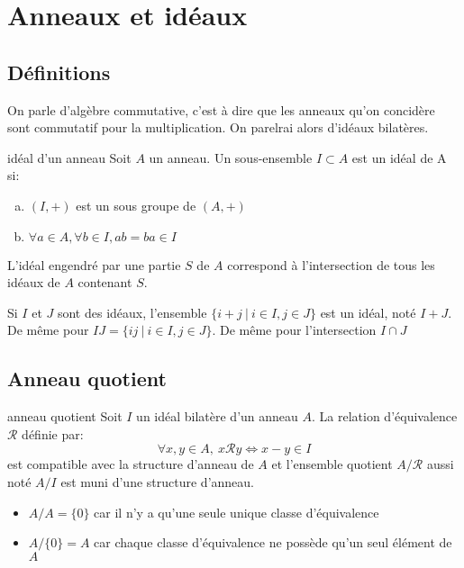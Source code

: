 \newpage


\section{Anneaux et idéaux}

\subsection{Définitions}

On parle d'algèbre commutative, c'est à dire que les anneaux qu'on concidère sont
commutatif pour la multiplication. On parelrai alors d'idéaux bilatères.

\begin{definition}{idéal d'un anneau}{}
    Soit $A$ un anneau. Un sous-ensemble $I \subset A$ est un idéal de A si:
    \begin{enumerate}[(a)]
        \item $(I, +)$ est un sous groupe de $(A, +)$
        \item $\forall a \in A, \forall b \in I, ab = ba \in I$
    \end{enumerate}
\end{definition}

\begin{proposition}{}{}
    L'idéal engendré par une partie $S$ de $A$ correspond à l'intersection de tous les
    idéaux de $A$ contenant $S$.
\end{proposition}

    
Si $I$ et $J$ sont des idéaux, l'ensemble $\{i + j ~ | ~ i \in I, j \in J\}$ est un idéal,
noté $I+J$. De même pour $IJ = \{ij ~ | ~ i \in I, j \in J\}$. 
De même pour l'intersection $I \cap J$



\subsection{Anneau quotient}

\begin{definition}{anneau quotient}{}
    Soit $I$ un idéal bilatère d'un anneau $A$. La relation d'équivalence $\mathcal{R}$ définie par:
    \[ \forall x, y \in A, ~ x \mathcal{R} y \Longleftrightarrow x - y \in I \]
    est compatible avec la structure d'anneau de $A$ et l'ensemble quotient $A/\mathcal{R}$
    aussi noté $A/I$ est muni d'une structure d'anneau.
\end{definition}

\begin{example}{}{}
    \begin{itemize}
        \item $A / A = \{0\}$ car il n'y a qu'une seule unique classe d'équivalence
        \item $A / \{0\} = A$ car chaque classe d'équivalence ne possède qu'un seul élément de $A$
    \end{itemize}
\end{example}


